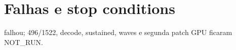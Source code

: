 \section{Falhas e stop conditions}
 falhou; 496/1522, decode, sustained, waves e segunda patch GPU ficaram NOT\_RUN.

